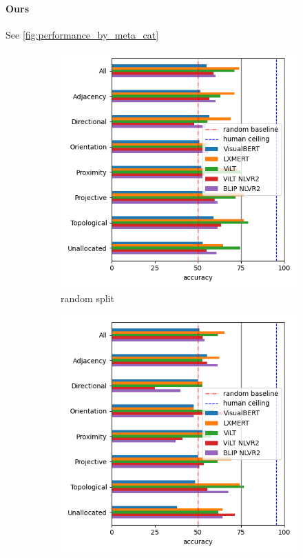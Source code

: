 \paragraph{Ours}

See \cref{fig:performance_by_meta_cat}

\begin{figure}[ht]
    \centering
    \begin{subfigure}[b]{0.49\linewidth}
    \centering
    \includegraphics[width=\linewidth]{images/visual-spatial-reasoning/performance_rel_meta_cat_random.png}
    \caption{random split}
     \end{subfigure}
     \begin{subfigure}[b]{0.49\linewidth}
         \centering
    \includegraphics[width=\linewidth]{images/visual-spatial-reasoning/performance_rel_meta_cat_zeroshot.png}

\end{subfigure}
\end{figure}
